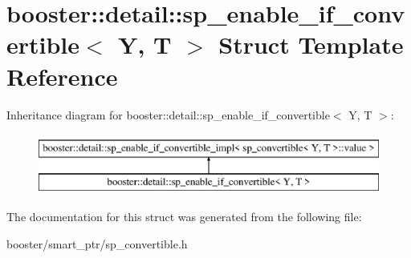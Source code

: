 \section{booster\-:\-:detail\-:\-:sp\-\_\-enable\-\_\-if\-\_\-convertible$<$ Y, T $>$ Struct Template Reference}
\label{structbooster_1_1detail_1_1sp__enable__if__convertible}
Inheritance diagram for booster\-:\-:detail\-:\-:sp\-\_\-enable\-\_\-if\-\_\-convertible$<$ Y, T $>$\-:\begin{figure}[H]
\begin{center}
\leavevmode
\includegraphics[height=2.000000cm]{structbooster_1_1detail_1_1sp__enable__if__convertible}
\end{center}
\end{figure}


The documentation for this struct was generated from the following file\-:\begin{DoxyCompactItemize}
\item 
booster/smart\-\_\-ptr/sp\-\_\-convertible.\-h\end{DoxyCompactItemize}
